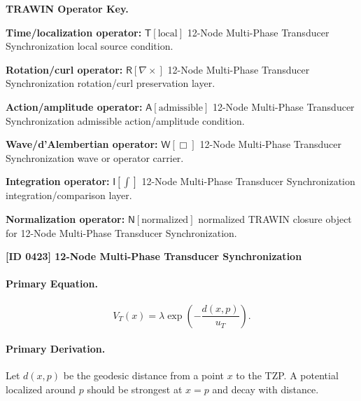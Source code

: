 \par\vspace{0.45\baselineskip}
\noindent\begin{minipage}[t]{\linewidth}
\begingroup
\small
\raggedright
\textbf{TRAWIN Operator Key.}\par
\noindent\textbf{Time/localization operator:} $\mathsf{T}\!\left[\mathrm{local}\right]$ 12-Node Multi-Phase Transducer Synchronization local source condition.\par
\noindent\textbf{Rotation/curl operator:} $\mathsf{R}\!\left[\nabla\times\right]$ 12-Node Multi-Phase Transducer Synchronization rotation/curl preservation layer.\par
\noindent\textbf{Action/amplitude operator:} $\mathsf{A}\!\left[\mathrm{admissible}\right]$ 12-Node Multi-Phase Transducer Synchronization admissible action/amplitude condition.\par
\noindent\textbf{Wave/d'Alembertian operator:} $\mathsf{W}\!\left[\Box\right]$ 12-Node Multi-Phase Transducer Synchronization wave or operator carrier.\par
\noindent\textbf{Integration operator:} $\mathsf{I}\!\left[\int\right]$ 12-Node Multi-Phase Transducer Synchronization integration/comparison layer.\par
\noindent\textbf{Normalization operator:} $\mathsf{N}\!\left[\mathrm{normalized}\right]$ normalized TRAWIN closure object for 12-Node Multi-Phase Transducer Synchronization.\par
\endgroup
\end{minipage}

\clearpage
\noindent\textbf{[ID 0423] 12-Node Multi-Phase Transducer Synchronization}\par
\vspace{0.35em}
\paragraph{Primary Equation.}
\begin{equation}
V_T(x)
=
\lambda
\exp\left(
-\frac{d(x,p)}{u_T}
\right).
\end{equation}

\paragraph{Primary Derivation.}
Let $d(x,p)$ be the geodesic distance from a point $x$ to the TZP.  
A potential localized around $p$ should be strongest at $x=p$ and decay with distance.

